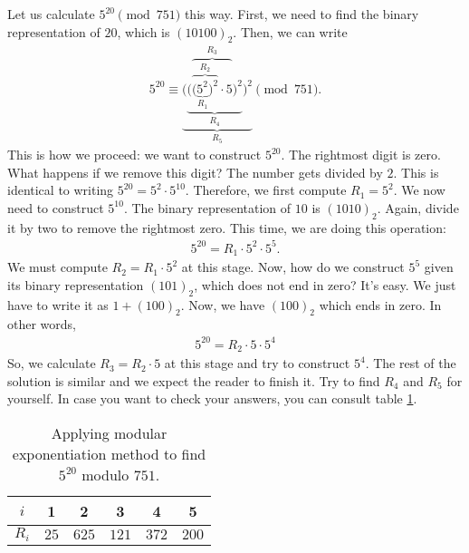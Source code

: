 \documentclass{subfile}
\begin{document}
	\begin{example}
		Let us calculate $5^{20} \pmod{751}$ this way. First, we need to find the binary representation of $20$, which is $(10100)_2$. Then, we can write
			\begin{align*}
				5^{20} \equiv  \underbrace{\Bigg(\underbrace{\bigg(\overbrace{\overbrace{\big(\underbrace{5^2}_{R_1}\big)^2}^{R_2} \cdot 5}^{R_3}\bigg)^2}_{R_4}\Bigg)^2}_{R_5} \pmod{751}.
			\end{align*}
		This is how we proceed: we want to construct $5^{20}$. The rightmost digit is zero. What happens if we remove this digit? The number gets divided by $2$. This is identical to writing $5^{20} = 5^2 \cdot 5^{10}$. Therefore, we first compute $R_1=5^2$. We now need to construct $5^{10}$. The binary representation of $10$ is $(1010)_2$. Again, divide it by two to remove the rightmost zero. This time, we are doing this operation:
			\begin{align*}
				5^{20} = R_1 \cdot 5^2 \cdot 5^5.
			\end{align*}
		We must compute $R_2 = R_1 \cdot 5^2$ at this stage. Now, how do we construct $5^5$ given its binary representation $(101)_2$, which does not end in zero? It's easy. We just have to write it as $1+(100)_2$. Now, we have $(100)_2$ which ends in zero. In other words,
			\begin{align*}
				5^{20} = R_2 \cdot 5 \cdot 5^4
			\end{align*}
		So, we calculate $R_3 = R_2 \cdot 5$ at this stage and try to construct $5^4$. The rest of the solution is similar and we expect the reader to finish it. Try to find $R_4$ and $R_5$ for yourself. In case you want to check your answers, you can consult table \ref{table:modexp}.
		
		\begin{table}[ht]
			\centering
			\begin{tabular}{|c|c|c|c|c|c|} 
				\hline 
				$i$ & 1 & 2 & 3 & 4 & 5  \\ 
				\hline 
				$R_i$ & $25$ & $625$ &  $121$ & $372$ & $200$\\ 
				\hline
			\end{tabular} 
			\caption{Applying modular exponentiation method to find $5^{20}$ modulo $751$.}
			\label{table:modexp}
		\end{table}
	\end{example}
\end{document}
